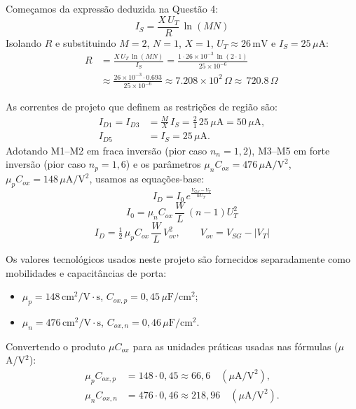 ﻿\documentclass[12pt,a4paper]{article}
\begin{document}
Começamos da expressão deduzida na Questão 4:
\begin{equation}
    I_S = \frac{X\,U_T}{R}\,\ln(MN)
\end{equation}
Isolando $R$ e substituindo $M=2$, $N=1$, $X=1$, $U_T\approx 26\,\text{mV}$ e $I_S=25\,\mu\text{A}$:
\begin{align}
    R 
    &= \frac{X\,U_T\,\ln(MN)}{I_S}
     = \frac{1\cdot 26\times 10^{-3}\,\ln(2\cdot 1)}{25\times 10^{-6}} \\[4pt]
    &\approx \frac{26\times 10^{-3}\cdot 0.693}{25\times 10^{-6}}
     \approx 7.208\times 10^{2} \, \Omega
     \approx \boxed{\,720.8\,\Omega\,}
\end{align}

As correntes de projeto que definem as restrições de região são:
\begin{align}
    I_{D1} = I_{D3} &= \frac{M}{X}\,I_S = \frac{2}{1}\,25\,\mu\text{A} = 50\,\mu\text{A}, \\
    I_{D5} &= I_S = 25\,\mu\text{A}.
\end{align}
Adotando M1–M2 em fraca inversão (pior caso $n_n=1{,}2$), M3–M5 em forte inversão (pior caso $n_p=1{,}6$) e os parâmetros $\mu_n C_{ox}=476\,\mu\text{A}/\text{V}^2$, $\mu_p C_{ox}=148\,\mu\text{A}/\text{V}^2$, usamos as equações-base:
\begin{equation}\label{eq:weak-id}
I_D = I_0\, e^{\tfrac{V_{GS}-V_T}{nU_T}}
\end{equation}
\begin{equation}\label{eq:I0}
I_0 = \mu_n C_{ox}\,\frac{W}{L}\,(n-1)U_T^2
\end{equation}
\begin{equation}\label{eq:strong-id}
I_D = \tfrac{1}{2}\,\mu_p C_{ox}\,\frac{W}{L}\,V_{ov}^2,\qquad V_{ov}=V_{SG}-|V_T|
\end{equation}

Os valores tecnológicos usados neste projeto são fornecidos separadamente como mobilidades e capacitâncias de porta:
\begin{center}
\begin{minipage}{0.55\textwidth}
\begin{itemize}
    \item $\mu_p = 148\,\text{cm}^2/\text{V}\cdot\text{s}$, \quad $C_{ox,p}=0{,}45\,\mu\text{F}/\text{cm}^2$;
    \item $\mu_n = 476\,\text{cm}^2/\text{V}\cdot\text{s}$, \quad $C_{ox,n}=0{,}46\,\mu\text{F}/\text{cm}^2$.
\end{itemize}
\end{minipage}
\end{center}
Convertendo o produto $\mu C_{ox}$ para as unidades práticas usadas nas fórmulas ($\mu$A/V$^2$):
\begin{align*}
\mu_p C_{ox,p} &= 148\cdot 0{,}45 \approx 66{,}6\quad (\mu\text{A}/\text{V}^2),\\
\mu_n C_{ox,n} &= 476\cdot 0{,}46 \approx 218{,}96\quad (\mu\text{A}/\text{V}^2).
\end{align*}
\end{document}
